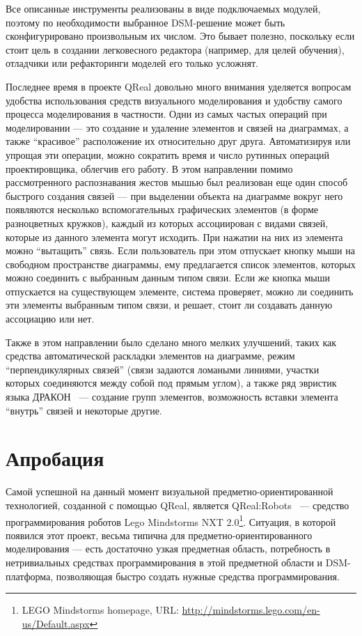 \documentclass[a4]{article}
\begin{document}
Все описанные инструменты реализованы в виде подключаемых модулей, поэтому по необходимости выбранное DSM-решение может быть сконфигурировано произвольным их числом. Это бывает полезно, поскольку если стоит цель в создании легковесного редактора (например, для целей обучения), отладчики или рефакторинги моделей его только усложнят.

Последнее время в проекте QReal довольно много внимания уделяется вопросам удобства использования средств визуального моделирования и удобству самого процесса моделирования в частности. Одни из самых частых операций при моделировании --- это создание и удаление элементов и связей на диаграммах, а также ``красивое'' расположение их относительно друг друга. Автоматизируя или упрощая эти операции, можно сократить время и число рутинных операций проектировщика, облегчив его работу. В этом направлении помимо рассмотренного распознавания жестов мышью был реализован еще один способ быстрого создания связей --- при выделении объекта на диаграмме вокруг него появляются несколько вспомогательных графических элементов (в форме разноцветных кружков), каждый из которых ассоциирован с видами связей, которые из данного элемента могут исходить. При нажатии на них из элемента можно ``вытащить'' связь. Если пользователь при этом отпускает кнопку мыши на свободном пространстве диаграммы, ему предлагается список элементов, которых можно соединить с выбранным данным типом связи. Если же кнопка мыши отпускается на существующем элементе, система проверяет, можно ли соединить эти элементы выбранным типом связи, и решает, стоит ли создавать данную ассоциацию или нет. 

Также в этом направлении было сделано много мелких улучшений, таких как средства автоматической раскладки элементов на диаграмме, режим ``перпендикулярных связей'' (связи задаются ломаными линиями, участки которых соединяются между собой под прямым углом), а также ряд эвристик языка ДРАКОН~\cite{dragon} --- создание групп элементов, возможность вставки элемента ``внутрь'' связей и некоторые другие.

\section{Апробация}

Самой успешной на данный момент визуальной предметно-ориентированной технологией, созданной с помощью QReal, является QReal:Robots~\cite{qrealrobots} --- средство программирования роботов Lego Mindstorms NXT 2.0\footnote{LEGO Mindstorms homepage, URL: \url{http://mindstorms.lego.com/en-us/Default.aspx}}. Ситуация, в которой появился этот проект, весьма типична для предметно-ориентированного моделирования --- есть достаточно узкая предметная область, потребность в нетривиальных средствах программирования в этой предметной области и DSM-платформа, позволяющая быстро создать нужные средства программирования.
\end{document}
